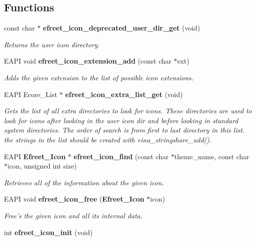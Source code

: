 \subsection*{Functions}
\begin{CompactItemize}
\item 
const char $\ast$ {\bf efreet\_\-icon\_\-deprecated\_\-user\_\-dir\_\-get} (void)
\begin{CompactList}\small\item\em Returns the user icon directory. \item\end{CompactList}\item 
EAPI void {\bf efreet\_\-icon\_\-extension\_\-add} (const char $\ast$ext)
\begin{CompactList}\small\item\em Adds the given extension to the list of possible icon extensions. \item\end{CompactList}\item 
EAPI Ecore\_\-List $\ast$ {\bf efreet\_\-icon\_\-extra\_\-list\_\-get} (void)
\begin{CompactList}\small\item\em Gets the list of all extra directories to look for icons. These directories are used to look for icons after looking in the user icon dir and before looking in standard system directories. The order of search is from first to last directory in this list. the strings in the list should be created with eina\_\-stringshare\_\-add(). \item\end{CompactList}\item 
EAPI {\bf Efreet\_\-Icon} $\ast$ {\bf efreet\_\-icon\_\-find} (const char $\ast$theme\_\-name, const char $\ast$icon, unsigned int size)
\begin{CompactList}\small\item\em Retrieves all of the information about the given icon. \item\end{CompactList}\item 
EAPI void {\bf efreet\_\-icon\_\-free} ({\bf Efreet\_\-Icon} $\ast$icon)
\begin{CompactList}\small\item\em Free's the given icon and all its internal data. \item\end{CompactList}\item 
int {\bf efreet\_\-icon\_\-init} (void)

\end{CompactItemize}

